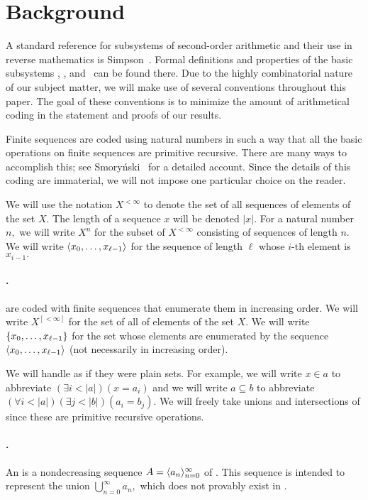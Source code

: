 \documentclass[csc]{subfiles}
\begin{document}
\section{Background}

A standard reference for subsystems of second-order arithmetic and their use in reverse mathematics is Simpson~\cite{Simpson09}.
Formal definitions and properties of the basic subsystems \RCA, \WKL, and \ACA\ can be found there.
Due to the highly combinatorial nature of our subject matter, we will make use of several conventions throughout this paper.
The goal of these conventions is to minimize the amount of arithmetical coding in the statement and proofs of our results.

Finite sequences are coded using natural numbers in such a way that all the basic operations on finite sequences are primitive recursive.
There are many ways to accomplish this; see Smory{\'n}ski~\cite{Smorynski77} for a detailed account.
Since the details of this coding are immaterial, we will not impose one particular choice on the reader.

We will use the notation \(X^{<\infty}\) to denote the set of all sequences of elements of the set \(X.\)
The length of a sequence \(x\) will be denoted \(|x|.\)
For a natural number \(n,\) we will write \(X^n\) for the subset of \(X^{<\infty}\) consisting of sequences of length \(n.\)
We will write \(\langle x_0,\dots,x_{\ell-1}\rangle\) for the sequence of length \(\ell\) whose \(i\)-th element is \(x_{i-1}.\)

\paragraph{.}
 are coded with finite sequences that enumerate them in increasing order.
We will write \(X^{[<\infty]}\) for the set of all  of elements of the set \(X.\)
We will write \(\lbrace x_0,\dots,x_{\ell-1}\rbrace\) for the set whose elements are enumerated by the sequence \(\langle x_0,\dots,x_{\ell-1}\rangle\) (not necessarily in increasing order).

We will handle  as if they were plain sets.
For example, we will write \(x \in a\) to abbreviate \((\exists i < |a|)(x = a_i)\) and we will write \(a \subseteq b\) to abbreviate \((\forall i < |a|)(\exists j < |b|)(a_i = b_j).\)
We will freely take unions and intersections of  since these are primitive recursive operations.

\paragraph{.}
An \emph{\eset{}} is a nondecreasing sequence \(A = \langle a_n\rangle_{n=0}^\infty\) of .
This sequence is intended to represent the union \(\bigcup_{n=0}^\infty a_n,\) which does not provably exist in \RCA.
\end{document}
